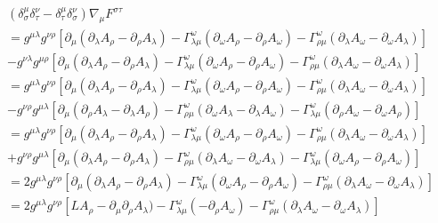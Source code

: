\documentclass[12pt]{article}
\def\nn{\nonumber}
\begin{document}
\begin{gather}
(\delta^{\mu}_{\sigma} \delta^{\nu}_{\tau} - \delta^{\mu}_{\tau} \delta^{\nu}_{\sigma})
\nabla_{\mu}
F^{\sigma \tau}
\nn \\
=
g^{\mu \lambda} g^{\nu \rho} 
\left[
\partial_{\mu} 
(\partial_{\lambda}A_{\rho}
-
\partial_{\rho}A_{\lambda})
-
\Gamma_{\lambda \mu}^{\omega} 
(\partial_{\omega} A_{\rho}
-
\partial_{\rho} A_{\omega})
-
\Gamma_{\rho \mu}^{\omega}
(\partial_{\lambda} A_{\omega}
-
\partial_{\omega} A_{\lambda})
\right]
\nn \\
-
g^{\nu \lambda} g^{\mu \rho} 
\left[
\partial_{\mu} 
(\partial_{\lambda}A_{\rho}
-
\partial_{\rho}A_{\lambda})
-
\Gamma_{\lambda \mu}^{\omega} 
(\partial_{\omega} A_{\rho}
-
\partial_{\rho} A_{\omega})
-
\Gamma_{\rho \mu}^{\omega}
(\partial_{\lambda} A_{\omega}
-
\partial_{\omega} A_{\lambda})
\right]
\nn \\
=
g^{\mu \lambda} g^{\nu \rho} 
\left[
\partial_{\mu} 
(\partial_{\lambda}A_{\rho}
-
\partial_{\rho}A_{\lambda})
-
\Gamma_{\lambda \mu}^{\omega} 
(\partial_{\omega} A_{\rho}
-
\partial_{\rho} A_{\omega})
-
\Gamma_{\rho \mu}^{\omega}
(\partial_{\lambda} A_{\omega}
-
\partial_{\omega} A_{\lambda})
\right]
\nn \\
-
g^{\nu \rho} g^{\mu \lambda} 
\left[
\partial_{\mu} 
(\partial_{\rho}A_{\lambda}
-
\partial_{\lambda}A_{\rho})
-
\Gamma_{\rho \mu}^{\omega} 
(\partial_{\omega} A_{\lambda}
-
\partial_{\lambda} A_{\omega})
-
\Gamma_{\lambda \mu}^{\omega}
(\partial_{\rho} A_{\omega}
-
\partial_{\omega} A_{\rho})
\right]
\nn \\
=
g^{\mu \lambda} g^{\nu \rho} 
\left[
\partial_{\mu} 
(\partial_{\lambda}A_{\rho}
-
\partial_{\rho}A_{\lambda})
-
\Gamma_{\lambda \mu}^{\omega} 
(\partial_{\omega} A_{\rho}
-
\partial_{\rho} A_{\omega})
-
\Gamma_{\rho \mu}^{\omega}
(\partial_{\lambda} A_{\omega}
-
\partial_{\omega} A_{\lambda})
\right]
\nn \\
+
g^{\nu \rho} g^{\mu \lambda} 
\left[
\partial_{\mu} 
(
\partial_{\lambda}A_{\rho}
-
\partial_{\rho}A_{\lambda})
-
\Gamma_{\rho \mu}^{\omega} 
(\partial_{\lambda} A_{\omega}
-
\partial_{\omega} A_{\lambda})
-
\Gamma_{\lambda \mu}^{\omega}
(\partial_{\omega} A_{\rho}
-
\partial_{\rho} A_{\omega})
\right]
\nn \\
=
2
g^{\mu \lambda} g^{\nu \rho} 
\left[
\partial_{\mu} 
(\partial_{\lambda}A_{\rho}
-
\partial_{\rho}A_{\lambda})
-
\Gamma_{\lambda \mu}^{\omega} 
(\partial_{\omega} A_{\rho}
-
\partial_{\rho} A_{\omega})
-
\Gamma_{\rho \mu}^{\omega}
(\partial_{\lambda} A_{\omega}
-
\partial_{\omega} A_{\lambda})
\right]
\nn \\
=
2
g^{\mu \lambda} g^{\nu \rho} 
\left[
L
A_{\rho}
-
\partial_{\mu} 
\partial_{\rho}A_{\lambda})
-
\Gamma_{\lambda \mu}^{\omega} 
(-
\partial_{\rho} A_{\omega})
-
\Gamma_{\rho \mu}^{\omega}
(\partial_{\lambda} A_{\omega}
-
\partial_{\omega} A_{\lambda})
\right]
\end{gather}
\end{document}
